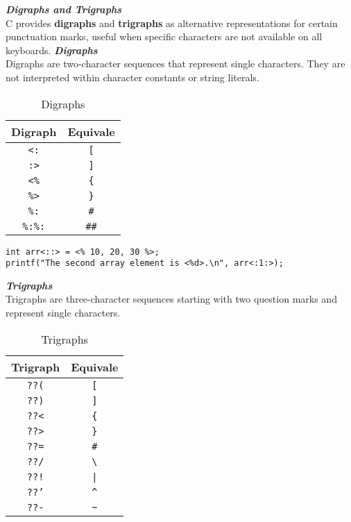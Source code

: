 \textbf{\textit{Digraphs and Trigraphs}} \\
C provides \textbf{digraphs} and \textbf{trigraphs} as alternative representations for certain punctuation marks, useful when specific characters are not available on all keyboards.
\textbf{\textit{Digraphs}} \\
Digraphs are two-character sequences that represent single characters. They are not interpreted within character constants or string literals.
\begin{table}[h]
\centering
\begin{tabular}{|>{}c|c|}
\hline
\rowcolor{tableheader}
\textbf{Digraph}        & \textbf{Equivale} \\
\hline \texttt{<:}      & \texttt{[} \\
\hline \texttt{:>}      & \texttt{]} \\
\hline \texttt{<\%}     & \texttt{\{} \\
\hline \texttt{\%>}     & \texttt{\}} \\
\hline \texttt{\%:}     & \texttt{\#} \\
\hline \texttt{\%:\%:}  & \texttt{\#\#} \\
\hline
\end{tabular}
\caption{Digraphs}
\end{table}
\begin{tcolorbox}[title=Example with digraphs]
\begin{verbatim}
int arr<::> = <% 10, 20, 30 %>;
printf("The second array element is <%d>.\n", arr<:1:>);
\end{verbatim}
\end{tcolorbox}
\textbf{\textit{Trigraphs}} \\
Trigraphs are three-character sequences starting with two question marks and represent single characters.
\begin{table}[h]
\centering
\begin{tabular}{|>{}c|c|}
\hline
\rowcolor{tableheader}
\textbf{Trigraph}       & \textbf{Equivale} \\
\hline \texttt{??(}     & \texttt{[} \\
\hline \texttt{??)}     & \texttt{]} \\
\hline \texttt{??<}     & \texttt{\{} \\
\hline \texttt{??>}     & \texttt{\}} \\
\hline \texttt{??=}     & \texttt{\#} \\
\hline \texttt{??/}     & \texttt{\textbackslash} \\
\hline \texttt{??!}     & \texttt{|} \\
\hline \texttt{??'}     & \texttt{\textasciicircum} \\
\hline \texttt{??-}     & \texttt{\textasciitilde} \\
\hline
\end{tabular}
\caption{Trigraphs}
\end{table}
